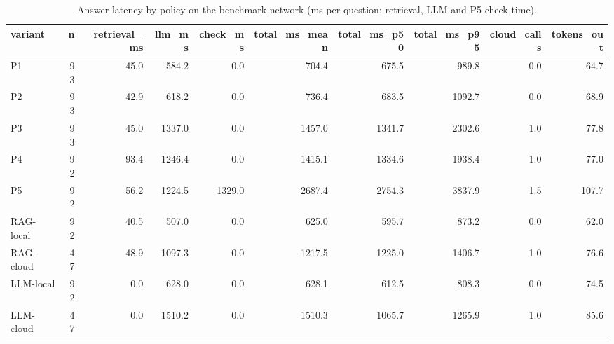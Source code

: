 \begin{table}[htbp]
\centering
\small
\caption{Answer latency by policy on the benchmark network (ms per question; retrieval, LLM and P5 check time).}
\label{tab:latency_breakdown}
\begin{tabular}{l r r r r r r r r r}
\toprule
variant & n & retrieval\_ms & llm\_ms & check\_ms & total\_ms\_mean & total\_ms\_p50 & total\_ms\_p95 & cloud\_calls & tokens\_out \\
\midrule
P1 & 93 & 45.0 & 584.2 & 0.0 & 704.4 & 675.5 & 989.8 & 0.0 & 64.7 \\
P2 & 93 & 42.9 & 618.2 & 0.0 & 736.4 & 683.5 & 1092.7 & 0.0 & 68.9 \\
P3 & 93 & 45.0 & 1337.0 & 0.0 & 1457.0 & 1341.7 & 2302.6 & 1.0 & 77.8 \\
P4 & 92 & 93.4 & 1246.4 & 0.0 & 1415.1 & 1334.6 & 1938.4 & 1.0 & 77.0 \\
P5 & 92 & 56.2 & 1224.5 & 1329.0 & 2687.4 & 2754.3 & 3837.9 & 1.5 & 107.7 \\
RAG-local & 92 & 40.5 & 507.0 & 0.0 & 625.0 & 595.7 & 873.2 & 0.0 & 62.0 \\
RAG-cloud & 47 & 48.9 & 1097.3 & 0.0 & 1217.5 & 1225.0 & 1406.7 & 1.0 & 76.6 \\
LLM-local & 92 & 0.0 & 628.0 & 0.0 & 628.1 & 612.5 & 808.3 & 0.0 & 74.5 \\
LLM-cloud & 47 & 0.0 & 1510.2 & 0.0 & 1510.3 & 1065.7 & 1265.9 & 1.0 & 85.6 \\
\bottomrule
\end{tabular}
\end{table}
